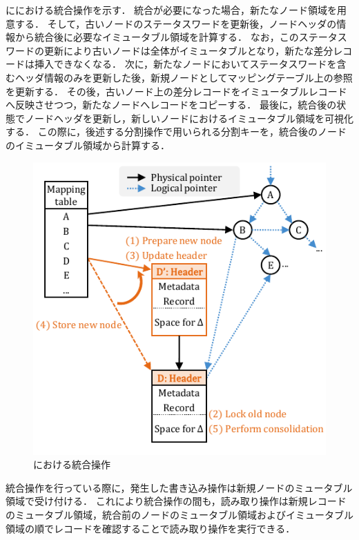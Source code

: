 \Fig{\ref{fig:bc_tree_consolidastion}}に\Bctree{}における統合操作を示す．
統合が必要になった場合，新たなノード領域を用意する．
そして，古いノードのステータスワードを更新後，ノードヘッダの情報から統合後に必要なイミュータブル領域を計算する．
なお，このステータスワードの更新により古いノードは全体がイミュータブルとなり，新たな差分レコードは挿入できなくなる．
次に，新たなノードにおいてステータスワードを含むヘッダ情報のみを更新した後，新規ノードとしてマッピングテーブル上の参照を更新する．
その後，古いノード上の差分レコードをイミュータブルレコードへ反映させつつ，新たなノードへレコードをコピーする．
最後に，統合後の状態でノードヘッダを更新し，新しいノードにおけるイミュータブル領域を可視化する．
この際に，後述する分割操作で用いられる分割キーを，統合後のノードのイミュータブル領域から計算する．

\begin{figure}[t]
    \centering
    \includegraphics{./figures/Bc-consolidate.pdf}
    \caption{\Bctree{}における統合操作}
    \label{fig:bc_tree_consolidastion}
\end{figure}

統合操作を行っている際に，発生した書き込み操作は新規ノードのミュータブル領域で受け付ける．
これにより統合操作の間も，読み取り操作は新規レコードのミュータブル領域，統合前のノードのミュータブル領域およびイミュータブル領域の順でレコードを確認することで読み取り操作を実行できる．

